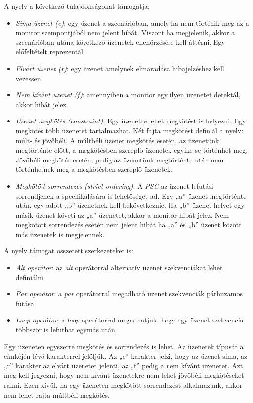 A nyelv a következő tulajdonságokat támogatja:
\begin{itemize}
    \item \textit{Sima üzenet (e)}: egy üzenet a szcenárióban, amely ha nem történik meg az a monitor szempontjából nem jelent hibát.
    Viszont ha megjelenik, akkor a szcenárióban utána következő üzenetek ellenőrzésére kell áttérni.
    Egy előfeltételt reprezentál.
    \item \textit{Elvárt üzenet (r)}: egy üzenet amelynek elmaradása hibajelzéshez kell vezessen.
    \item \textit{Nem kívánt üzenet (f)}: amennyiben a monitor egy ilyen üzenetet detektál, akkor hibát jelez.
    \item \textit{Üzenet megkötés (constraint)}: Egy üzenetre lehet megkötést is helyezni.
    Egy megkötés több üzenetet tartalmazhat.
    Két fajta megkötést definiál a nyelv: múlt- és jövőbéli.
    A múltbéli üzenet megkötés esetén, az üzenetünk megtörténte előtt, a megkötésben szereplő üzenetek egyike se történhet meg.
    Jövőbéli megkötés esetén, pedig az üzenetünk megtörténte után nem történhetnek meg a megkötésben szereplő üzenetek.
    \item \textit{Megkötött sorrendezés (strict ordering)}: A \textit{PSC} az üzenet lefutási sorrendjének a specifikálására is lehetőséget ad.
    Egy „a” üzenet megtörténte után, egy adott „b” üzenetnek kell bekövetkeznie.
    Ha „b” üzenet helyet egy másik üzenet követi az „a” üzenetet, akkor a monitor hibát jelez.
    Nem megkötött sorrendezés esetén nem jelent hibát ha „a” és „b” üzenet között más üzenetek is megjelennek.
\end{itemize}

A nyelv támogat összetett szerkezeteket is:

\begin{itemize}
    \item \textit{Alt operátor}: az \textit{alt} operátorral alternatív üzenet szekvenciákat lehet definiálni.
    \item \textit{Par operátor}: a \textit{par} operátorral megadható üzenet szekvenciák párhuzamos futása.
    \item \textit{Loop operátor}: a \textit{loop} operátorral megadhatjuk, hogy egy üzenet szekvencia többször is lefuthat egymás után.
\end{itemize}

Egy üzeneten egyszerre megkötés és sorrendezés is lehet.
Az üzenetek típusát a címkéjén lévő karakterrel jelöljük.
Az „e” karakter jelzi, hogy az üzenet sima, az „r” karakter az elvárt üzenetet jelenti, az „f” pedig a nem kívánt üzenetet.
Azt meg kell jegyezni, hogy nem kívánt üzenetekre nem lehet jövőbéli megkötéseket rakni.
Ezen kívül, ha egy üzeneten megkötött sorrendezést alkalmazunk, akkor nem lehet rajta múltbéli megkötés.

